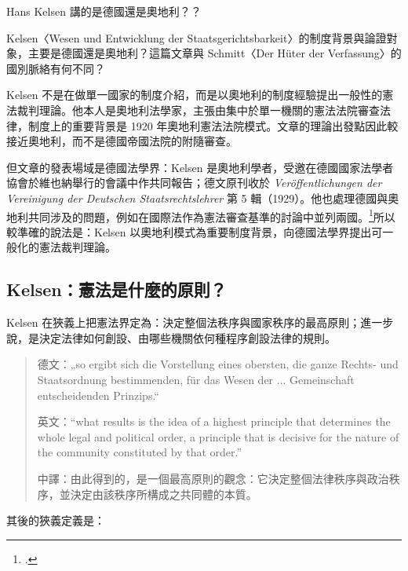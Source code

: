 
\begin{qaprompt}
Hans Kelsen 講的是德國還是奧地利？？
\end{qaprompt}

\begin{qaquestion}
Kelsen〈Wesen und Entwicklung der Staatsgerichtsbarkeit〉的制度背景與論證對象，主要是德國還是奧地利？這篇文章與 Schmitt〈Der Hüter der Verfassung〉的國別脈絡有何不同？
\end{qaquestion}

Kelsen 不是在做單一國家的制度介紹，而是以奧地利的制度經驗提出一般性的憲法裁判理論。他本人是奧地利法學家，主張由集中於單一機關的憲法法院審查法律，制度上的重要背景是 1920 年奧地利憲法法院模式。文章的理論出發點因此較接近奧地利，而不是德國帝國法院的附隨審查。

但文章的發表場域是德國法學界：Kelsen 是奧地利學者，受邀在德國國家法學者協會於維也納舉行的會議中作共同報告；德文原刊收於 \emph{Veröffentlichungen der Vereinigung der Deutschen Staatsrechtslehrer} 第 5 輯（1929）。他也處理德國與奧地利共同涉及的問題，例如在國際法作為憲法審查基準的討論中並列兩國。\footcites[58]{kelsen2015}[66]{kelsen1929}所以較準確的說法是：Kelsen 以奧地利模式為重要制度背景，向德國法學界提出可一般化的憲法裁判理論。

\subsection{Kelsen：憲法是什麼的原則？}

Kelsen 在狹義上把憲法界定為：決定整個法秩序與國家秩序的最高原則；進一步說，是決定法律如何創設、由哪些機關依何種程序創設法律的規則。

\begin{quote}
德文：„so ergibt sich die Vorstellung eines obersten, die ganze Rechts- und Staatsordnung bestimmenden, für das Wesen der ... Gemeinschaft entscheidenden Prinzips.``

英文：``what results is the idea of a highest principle that determines the whole legal and political order, a principle that is decisive for the nature of the community constituted by that order.''

中譯：由此得到的，是一個最高原則的觀念：它決定整個法律秩序與政治秩序，並決定由該秩序所構成之共同體的本質。
\end{quote}

其後的狹義定義是：

